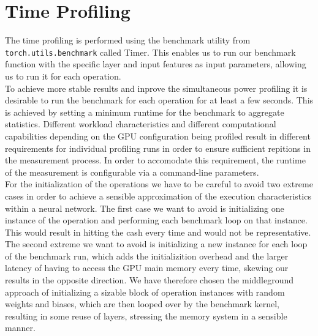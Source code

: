 
\section{Time Profiling}



The time profiling is performed using the benchmark utility from \texttt{torch.utils.benchmark} called Timer. This enables us to run our benchmark function with the specific layer and input features as input parameters, allowing us to run it for each operation. \\
To achieve more stable results and inprove the simultaneous power profiling it is desirable to run the benchmark for each operation for at least a few seconds. This is achieved by setting a minimum runtime for the benchmark to aggregate statistics. Different workload characteristics and different computational capabilities depending on the GPU configuration being profiled result in different requirements for individual profiling runs in order to ensure sufficient repitions in the measurement process. In order to accomodate this requirement, the runtime of the measurement is configurable via a command-line parameters. \\
For the initialization of the operations we have to be careful to avoid two extreme cases in order to achieve a sensible approximation of the execution characteristics within a neural network. The first case we want to avoid is initializing one instance of the operation and performing each benchmark loop on that instance. This would result in hitting the cash every time and would not be representative. The second extreme we want to avoid is initializing a new instance for each loop of the benchmark run, which adds the initializition overhead and the larger latency of having to access the GPU main memory every time, skewing our results in the opposite direction. We have therefore chosen the middleground approach of initializing a sizable block of operation instances with random weights and biases, which are then looped over by the benchmark kernel, resulting in some reuse of layers, stressing the memory system in a sensible manner. \\


